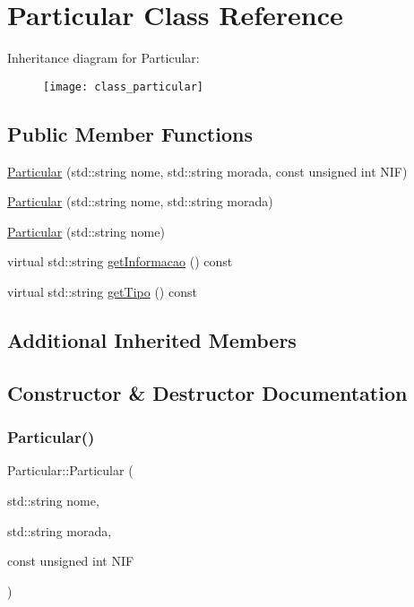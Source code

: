 \hypertarget{class_particular}{}\section{Particular Class Reference}
\label{class_particular}
Inheritance diagram for Particular\+:\begin{figure}[H]
\begin{center}
\leavevmode
\texttt{[image: class\_particular]}
\end{center}
\end{figure}
\subsection*{Public Member Functions}
\begin{DoxyCompactItemize}
\item 
\hyperlink{class_particular_a355034b30f29b3fecf6654de8d652aa7}{Particular} (std\+::string nome, std\+::string morada, const unsigned int N\+IF)
\item 
\hyperlink{class_particular_a794314799e022e8f05fda84af1722bc8}{Particular} (std\+::string nome, std\+::string morada)
\item 
\hyperlink{class_particular_a55ebdb7b32d55be44f903be5a4f4d6aa}{Particular} (std\+::string nome)
\item 
virtual std\+::string \hyperlink{class_particular_acde85dcb3d26ca3afe131fb4c35763c8}{get\+Informacao} () const
\item 
virtual std\+::string \hyperlink{class_particular_ac7fc22a792b8c711d5f424ad9af19755}{get\+Tipo} () const
\end{DoxyCompactItemize}
\subsection*{Additional Inherited Members}


\subsection{Constructor \& Destructor Documentation}
\hypertarget{class_particular_a355034b30f29b3fecf6654de8d652aa7}{}\label{class_particular_a355034b30f29b3fecf6654de8d652aa7} 
\subsubsection{\texorpdfstring{Particular()}{Particular()}\hspace{0.1cm}{\footnotesize\ttfamily [1/3]}}
{\footnotesize\ttfamily Particular\+::\+Particular (\begin{DoxyParamCaption}\item[{std\+::string}]{nome,  }\item[{std\+::string}]{morada,  }\item[{const unsigned int}]{N\+IF }\end{DoxyParamCaption})}

